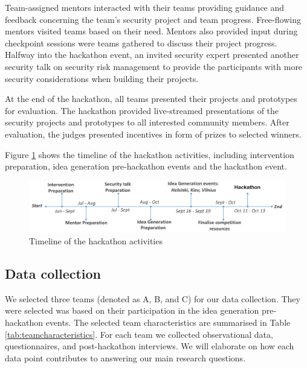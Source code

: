 \documentclass[runningheads]{llncs}
\begin{document}
Team-assigned mentors interacted with their teams providing guidance and feedback concerning the team's security project and team progress. Free-flowing mentors visited teams based on their need. Mentors also provided input during checkpoint sessions were teams gathered to discuss their project progress.
Halfway into the hackathon event, an invited security expert presented another security talk on security risk management to provide the participants with more security considerations when building their projects.

At the end of the hackathon, all teams presented their projects and prototypes for evaluation. The hackathon provided live-streamed presentations of the security projects and prototypes to all interested community members. After evaluation, the judges presented incentives in form of prizes to selected winners.

Figure \ref{Fig:timeline} shows the timeline of the hackathon activities, including intervention preparation, idea generation pre-hackathon events and the hackathon event.
\begin{figure}[hbt!]
\vspace{-5pt}
  \centering
  \includegraphics[width=\linewidth]{timelinehack.pdf}
  \caption{Timeline of the hackathon activities} \label{Fig:timeline} 
 \vspace{-10pt}
\end{figure}

\subsection{Data collection}
We selected three teams (denoted as A, B, and C) for our data collection. They were selected was based on their participation in the idea generation pre-hackathon events. The selected team characteristics are summarised in Table \ref{tab:teamcharacteristics}. For each team we collected observational data, questionnaires, and post-hackathon interviews. We will elaborate on how each data point contributes to answering our main research questions.
\end{document}
